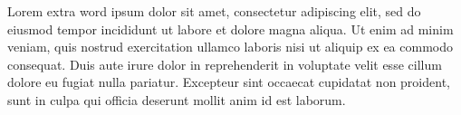 Lorem extra word ipsum dolor sit amet, consectetur adipiscing elit, sed do eiusmod tempor incididunt ut labore et dolore magna 
aliqua. Ut enim ad minim veniam, quis nostrud exercitation ullamco laboris nisi ut aliquip ex ea commodo consequat. Duis
 aute irure dolor in reprehenderit in voluptate velit esse cillum dolore eu fugiat nulla pariatur. Excepteur sint 
occaecat cupidatat non proident, sunt in culpa qui officia deserunt mollit anim id est laborum.
